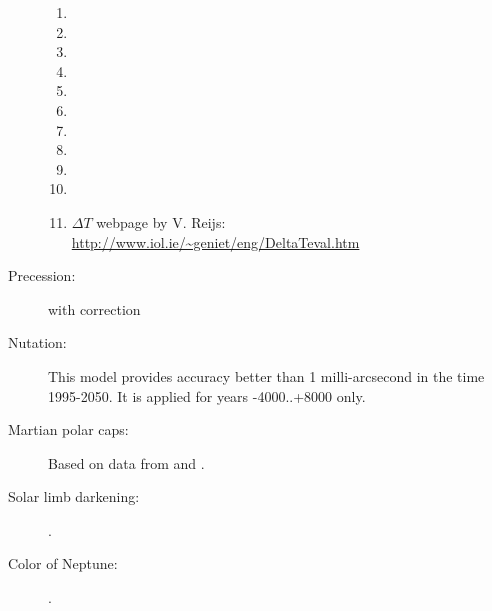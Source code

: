 \begin{description}
\begin{enumerate}
		\item {}%
		\item {}%
		\item {} %
		\item {} %
		\item {} %
		\item {} %
		\item {}  %
		\item {} %
		\item {} %
		\item {} %
		\item $\Delta T$ webpage by V. Reijs: \url{http://www.iol.ie/~geniet/eng/DeltaTeval.htm}
		\end{enumerate}
	\item[Precession:]  with correction \citep{2012AA:Vondrak} 
	\item[Nutation:]    %
		This model provides accuracy better than 1 milli-arcsecond in the
		time 1995-2050. It is applied for years -4000..+8000 only.
	\item[Martian polar caps:] Based on data from \citet{MarsPoles:2009} and \citet{MarsRotation:2015}.
	\item[Solar limb darkening:] \citet{LimbDarkening:2002}.	
	\item[Color of Neptune:] \citet{UranusNeptuneColor:2024}.
\end{description}		
		
